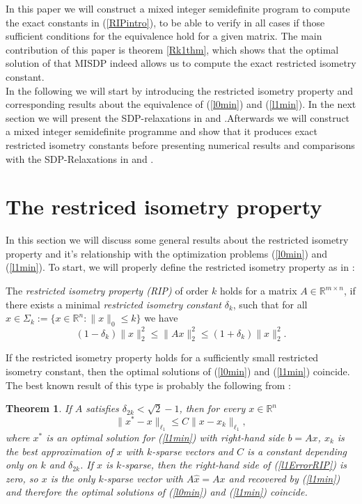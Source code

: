 \documentclass{elsarticle}
\newtheorem{thm}{Theorem}
\newcommand{\R}{\mathds{R}}
\begin{document}
In this paper we will construct a mixed integer semidefinite program to compute the exact constants in (\ref{RIPintro}), to be able to verify in all cases if those sufficient conditions for the equivalence hold for a given matrix. 
The main contribution of this paper is theorem \ref{Rk1thm}, which shows that the optimal solution of that MISDP indeed allows us to compute the exact restricted isometry constant.\\
In the following we will start by introducing the restricted isometry property and corresponding results about the equivalence of (\ref{l0min}) and (\ref{l1min}). In the next section we will present the SDP-relaxations in \cite{Asp07} 
and \cite{Asp08}.Afterwards we will construct a mixed integer semidefinite programme and show that it produces exact restricted isometry constants before presenting numerical results and comparisons with the SDP-Relaxations in 
\cite{Asp07} and \cite{Asp08}.

\section{The restriced isometry property}

In this section we will discuss some general results about the restricted isometry property and it's relationship with the optimization problems (\ref{l0min}) and (\ref{l1min}). To start, we will properly define the restricted
isometry property as in \cite{CT05}:

\begin{rmk} \label{ripdef}
The \emph{restricted isometry property (RIP)} of order $k$ holds for a matrix $A \in \R^{m \times n}$, if there exists a minimal \emph{restricted isometry constant} $\delta_k$, such that for all $x \in \Sigma_k := 
\{x \in \R^n : \|x\|_0 \leq k \}$ we have
 \begin{equation}\label{rip}
  (1-\delta_k)\|x\|_2^2 \leq \|Ax\|_2^2 \leq (1+\delta_k)\|x\|_2^2.
 \end{equation}
 \end{rmk}
 
 If the restricted isometry property holds for a sufficiently small restricted isometry constant, then the optimal solutions of (\ref{l0min}) and (\ref{l1min}) coincide. The best known result of this type is probably the following from
 \cite{Can08}:
 
\begin{thm} \label{RIPsqrt2}
 If $A$ satisfies $\delta_{2k} < \sqrt{2}-1$, then for every $x \in \R^n$
 \begin{equation*}\label{l1ErrorRIP}
  \|x^* - x \|_{\ell_1} \leq C \|x - x_k \|_{\ell_1},
 \end{equation*}
where $x^*$ is an optimal solution for (\ref{l1min}) with right-hand side $b = Ax$, $x_k$ is the best approximation of $x$ with $k$-sparse vectors and $C$ is a constant depending only on $k$ and $\delta_{2k}$. If $x$ is $k$-sparse, then the right-hand side of
(\ref{l1ErrorRIP}) is zero, so $x$ is the only $k$-sparse vector with $A\hat{x} = Ax$ and recovered by (\ref{l1min}) and therefore the optimal solutions of (\ref{l0min}) and (\ref{l1min}) coincide.\end{thm}
\end{document}
